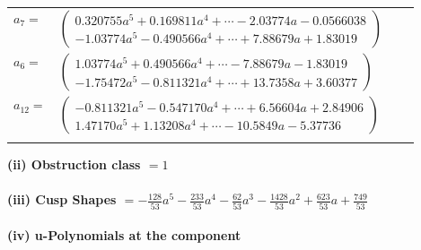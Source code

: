 \documentclass[1p]{elsarticle_modified}
\theoremstyle{definition}
\begin{document}
\begin{tabular}{m{7pt} m{180pt} m{7pt} m{180pt} }
\flushright $a_{7}=$&$\begin{pmatrix}0.320755 a^{5}+0.169811 a^{4}+\cdots-2.03774 a-0.0566038\\-1.03774 a^{5}-0.490566 a^{4}+\cdots+7.88679 a+1.83019\end{pmatrix}$ \\
\flushright $a_{6}=$&$\begin{pmatrix}1.03774 a^{5}+0.490566 a^{4}+\cdots-7.88679 a-1.83019\\-1.75472 a^{5}-0.811321 a^{4}+\cdots+13.7358 a+3.60377\end{pmatrix}$ \\
\flushright $a_{12}=$&$\begin{pmatrix}-0.811321 a^{5}-0.547170 a^{4}+\cdots+6.56604 a+2.84906\\1.47170 a^{5}+1.13208 a^{4}+\cdots-10.5849 a-5.37736\end{pmatrix}$\\&\end{tabular}
\flushleft \textbf{(ii) Obstruction class $= 1$}\\~\\
\flushleft \textbf{(iii) Cusp Shapes $= -\frac{128}{53} a^5-\frac{233}{53} a^4-\frac{62}{53} a^3-\frac{1428}{53} a^2+\frac{623}{53} a+\frac{749}{53}$}\\~\\
\newpage\renewcommand{\arraystretch}{1}
\flushleft \textbf{(iv) u-Polynomials at the component}\newline \\
\end{document}
